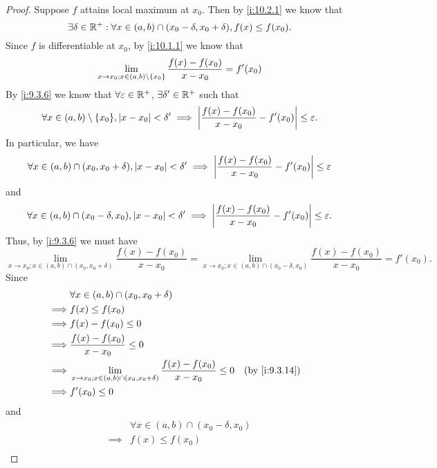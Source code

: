 \begin{proof}
  Suppose \(f\) attains local maximum at \(x_0\).
  Then by \cref{i:10.2.1} we know that
  \[
    \exists \delta \in \mathbb{R}^+ : \forall x \in (a, b) \cap (x_0 - \delta, x_0 + \delta), f(x) \leq f(x_0).
  \]
  Since \(f\) is differentiable at \(x_0\), by \cref{i:10.1.1} we know that
  \[
    \lim_{x \to x_0 ; x \in (a, b) \setminus \left\lbrace x_0\right\rbrace} \dfrac{f(x) - f(x_0)}{x - x_0} = f'(x_0)
  \]
  By \cref{i:9.3.6} we know that \(\forall \varepsilon \in \mathbb{R}^+\), \(\exists \delta' \in \mathbb{R}^+\) such that
  \[
    \forall x \in (a, b) \setminus \set{x_0}, \abs{x - x_0} < \delta' \implies \abs{\dfrac{f(x) - f(x_0)}{x - x_0} - f'(x_0)} \leq \varepsilon.
  \]
  In particular, we have
  \[
    \forall x \in (a, b) \cap (x_0, x_0 + \delta), \left\lvert x - x_0\right\rvert < \delta' \implies \left\lvert\dfrac{f(x) - f(x_0)}{x - x_0} - f'(x_0)\right\rvert \leq \varepsilon
  \]
  and
  \[
    \forall x \in (a, b) \cap (x_0 - \delta, x_0), \left\lvert x - x_0\right\rvert < \delta' \implies \left\lvert\dfrac{f(x) - f(x_0)}{x - x_0} - f'(x_0)\right\rvert \leq \varepsilon.
  \]
  Thus, by \cref{i:9.3.6} we must have
  \[
    \lim_{x \to x_0 ; x \in (a, b) \cap (x_0, x_0 + \delta)} \dfrac{f(x) - f(x_0)}{x - x_0} = \lim_{x \to x_0 ; x \in (a, b) \cap (x_0 - \delta, x_0)} \dfrac{f(x) - f(x_0)}{x - x_0} = f'(x_0).
  \]
  Since
  \begin{align*}
             & \forall x \in (a, b) \cap (x_0, x_0 + \delta)                                                                     \\
    \implies & f(x) \leq f(x_0)                                                                                                  \\
    \implies & f(x) - f(x_0) \leq 0                                                                                              \\
    \implies & \dfrac{f(x) - f(x_0)}{x - x_0} \leq 0                                                                             \\
    \implies & \lim_{x \to x_0 ; x \in (a, b) \cap (x_0, x_0 + \delta)} \dfrac{f(x) - f(x_0)}{x - x_0} \leq 0 &  & \by{i:9.3.14} \\
    \implies & f'(x_0) \leq 0
  \end{align*}
  and
  \begin{align*}
             & \forall x \in (a, b) \cap (x_0 - \delta, x_0)                                                                      \\
    \implies & f(x) \leq f(x_0)                                                                                                   \\

\end{align*}
\end{proof}
